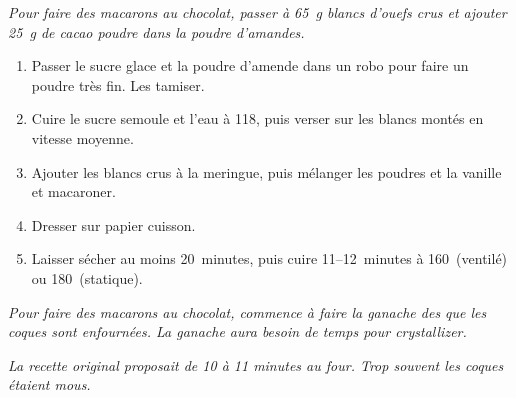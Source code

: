 


\begin{ingredients}
\end{ingredients}

{\it Pour faire des macarons au chocolat, passer \`a 65~g blancs
  d'ouefs crus et ajouter 25~g de cacao poudre dans la poudre
  d'amandes.}

\begin{recipe}
  \begin{enumerate}

  \item Passer le sucre glace et la poudre d'amende dans un robo pour
    faire un poudre tr\`es fin.  Les tamiser.

  \item Cuire le sucre semoule et l'eau \`a 118\C, puis verser sur les
    blancs mont\'es en vitesse moyenne.

  \item Ajouter les blancs crus \`a la meringue, puis m\'elanger les
    poudres et la vanille et macaroner.

  \item Dresser sur papier cuisson.

  \item Laisser s\'echer au moins 20~minutes, puis cuire
    11--12~minutes \`a 160\C\ (ventil\'e) ou 180\C\ (statique).
  \end{enumerate}
\end{recipe}

{\it Pour faire des macarons au chocolat, commence à faire la ganache
  des que les coques sont enfournées.  La ganache aura besoin de temps
  pour crystallizer.}

{\it La recette original proposait de 10 à 11 minutes au four.  Trop souvent les coques étaient mous.}


\begin{ingredients}
\end{ingredients}


